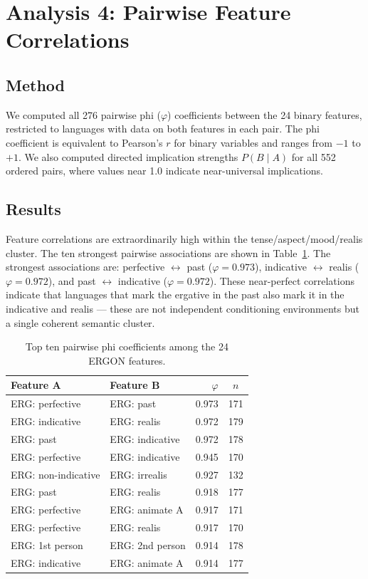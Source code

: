 \documentclass[12pt, a4paper]{article}
\begin{document}
\section{Analysis 4: Pairwise Feature Correlations}

\subsection{Method}

We computed all 276 pairwise phi ($\varphi$) coefficients between the 24 binary
features, restricted to languages with data on both features in each pair. The
phi coefficient is equivalent to Pearson's $r$ for binary variables and ranges
from $-1$ to $+1$. We also computed directed implication strengths $P(B \mid A)$
for all 552 ordered pairs, where values near 1.0 indicate near-universal
implications.

\subsection{Results}

Feature correlations are extraordinarily high within the tense/aspect/mood/realis
cluster. The ten strongest pairwise associations are shown in
Table~\ref{tab:phi}. The strongest associations are: perfective $\leftrightarrow$
past ($\varphi = 0.973$), indicative $\leftrightarrow$ realis ($\varphi =
0.972$), and past $\leftrightarrow$ indicative ($\varphi = 0.972$). These
near-perfect correlations indicate that languages that mark the ergative in the
past also mark it in the indicative and realis --- these are not independent
conditioning environments but a single coherent semantic cluster.

\begin{table}[H]
\centering
\caption{Top ten pairwise phi coefficients among the 24 ERGON features.}
\label{tab:phi}
\begin{tabular}{llrc}
\toprule
Feature A & Feature B & $\varphi$ & $n$ \\
\midrule
ERG: perfective     & ERG: past          & 0.973 & 171 \\
ERG: indicative     & ERG: realis        & 0.972 & 179 \\
ERG: past           & ERG: indicative    & 0.972 & 178 \\
ERG: perfective     & ERG: indicative    & 0.945 & 170 \\
ERG: non-indicative & ERG: irrealis      & 0.927 & 132 \\
ERG: past           & ERG: realis        & 0.918 & 177 \\
ERG: perfective     & ERG: animate A     & 0.917 & 171 \\
ERG: perfective     & ERG: realis        & 0.917 & 170 \\
ERG: 1st person     & ERG: 2nd person    & 0.914 & 178 \\
ERG: indicative     & ERG: animate A     & 0.914 & 177 \\
\bottomrule
\end{tabular}
\end{table}
\end{document}
